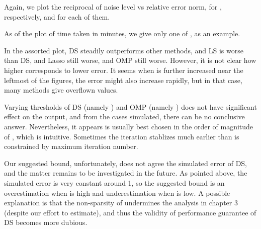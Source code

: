 \startsubsection [title={Plots of OMP only}]

Again, we plot the reciprocal of noise level vs relative error norm, for , respectively, and  for each of them.

%
\blank [big]
%
\blank [big]
%
\blank [big]
%
\blank [big]
%
\blank [big]
%
As of the plot of time taken in minutes, we give only one of , as an example.
%
\blank [big]

\stopsubsection

\startsubsection [title={Discussion}]

In the assorted plot, DS steadily outperforms other methods, and LS is worse than DS, and Lasso still worse, and OMP still worse.
However, it is not clear how higher \m {\s} corresponds to lower error.
It seems when \m {\s} is further increased near the leftmost of the figures, the error might also increase rapidly, but in that case, many methods give overflown values.

Varying thresholds of DS (namely ) and OMP (namely ) does not have significant effect on the output, and from the cases simulated, there can be no conclusive answer.
Nevertheless, it appears  is usually best chosen in the order of magnitude of \m {\s}, which is intuitive.
Sometimes the iteration stablizes much earlier than is constrained by maximum iteration number.

Our suggested bound, unfortunately, does not agree the simulated error of DS, and the matter remains to be investigated in the future.
As pointed above, the simulated error is very constant around 1, so the suggested bound is an overestimation when \m {\s} is high and underestimation when \m {\s} is low.
A possible explanation is that the non-sparsity of  undermines the analysis in chapter 3 (despite our effort to estimate), and thus the validity of performance guarantee of DS becomes more dubious.

\blank [big]

